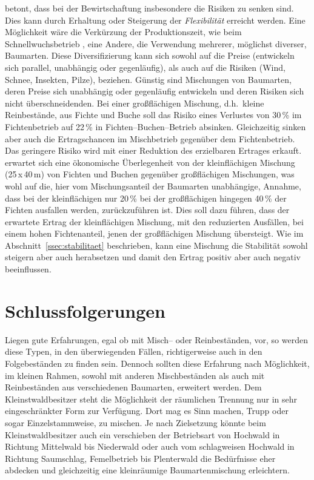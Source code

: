 \documentclass[twocolumn]{scrartcl}
\begin{document}
\cite{knoke2007mischwald} betont, dass bei der Bewirtschaftung
insbesondere die Risiken zu senken sind. Dies kann durch Erhaltung
oder Steigerung der \emph{Flexibilität} erreicht werden. Eine
Möglichkeit wäre die Verkürzung der Produktionszeit, wie beim
Schnellwuchsbetrieb
\citep{bohdanecky1890worlik,schiffel1904Wuchsgestze,schwappach1905durchforstungFichte,eulefeld1922schnellwuchs,gehrhardt1924StammzahlhaltungInJungenFichtenbestaenden},
eine Andere, die Verwendung mehrerer, möglichst diverser,
Baumarten. Diese Diversifizierung kann sich sowohl auf die Preise
(entwickeln sich parallel, unabhängig oder gegenläufig), als auch auf
die Risiken (Wind, Schnee, Insekten, Pilze), beziehen. Günstig sind
Mischungen von Baumarten, deren Preise sich unabhängig oder
gegenläufig entwickeln und deren Risiken sich nicht überschneidenden. Bei
einer großflächigen Mischung, d.h.\ kleine Reinbestände, aus Fichte
und Buche soll das Risiko eines Verlustes von 30\,\% im Fichtenbetrieb
auf 22\,\% in Fichten--Buchen--Betrieb absinken. Gleichzeitig sinken
aber auch die Ertragschancen im Mischbetrieb gegenüber dem
Fichtenbetrieb. Das geringere Risiko wird mit einer Reduktion des
erzielbaren Ertrages erkauft. \cite{knoke2007mischwaldB} erwartet sich
eine ökonomische Überlegenheit von der kleinflächigen Mischung
(25\,x\,40\,m) von Fichten und Buchen gegenüber großflächigen
Mischungen, was wohl auf die, hier vom Mischungsanteil der Baumarten
unabhängige, Annahme, dass bei der kleinflächigen nur 20\,\% bei der
großflächigen hingegen 40\,\% der Fichten ausfallen werden,
zurückzuführen ist. Dies soll dazu führen, dass der erwartete Ertrag
der kleinflächigen Mischung, mit den reduzierten Ausfällen, bei einem
hohen Fichtenanteil, jenen der großflächigen Mischung übersteigt. Wie
im Abschnitt~\ref{ssec:stabilitaet} beschrieben, kann eine Mischung
die Stabilität sowohl steigern aber auch herabsetzen und damit den
Ertrag positiv aber auch negativ beeinflussen.

\section{Schlussfolgerungen}
\label{sec:schlussfolgerungen}

Liegen gute Erfahrungen, egal ob mit Misch-- oder Reinbeständen, vor, so werden
diese Typen, in den überwiegenden Fällen, richtigerweise auch in den
Folgebeständen zu finden sein. Dennoch sollten diese Erfahrung nach Möglichkeit,
im kleinen Rahmen, sowohl mit anderen Mischbeständen als auch mit Reinbeständen
aus verschiedenen Baumarten, erweitert werden. Dem Kleinstwaldbesitzer steht die Möglichkeit der räumlichen Trennung nur in sehr eingeschränkter Form zur Verfügung. Dort mag es Sinn machen, Trupp oder sogar Einzelstammweise, zu mischen. Je nach Zielsetzung könnte beim Kleinstwaldbesitzer auch ein verschieben der Betriebsart von Hochwald in Richtung Mittelwald bis Niederwald oder auch vom schlagweisen Hochwald in Richtung Saumschlag, Femelbetrieb bis Plenterwald die Bedürfnisse eher abdecken und gleichzeitig eine kleinräumige Baumartenmischung erleichtern.
\end{document}
